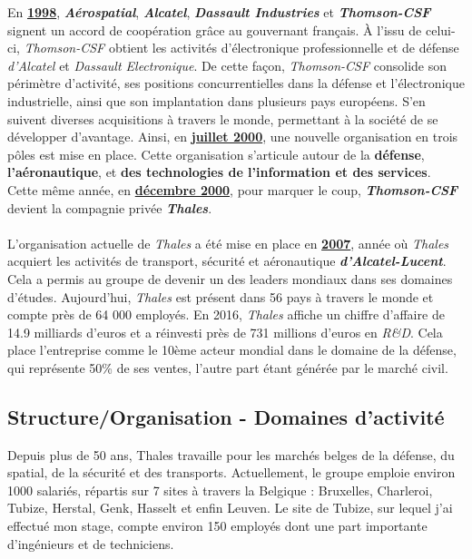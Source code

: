 \documentclass[10pt, oneside, a4paper]{article}
\begin{document}
En \underline{\textbf{1998}}, \textbf{\textit{Aérospatial}}, \textbf{\textit{Alcatel}}, \textbf{\textit{Dassault Industries}} et \textbf{\textit{Thomson-CSF}} signent un accord de coopération grâce au gouvernant français. À l’issu de celui-ci, \textit{Thomson-CSF} obtient les activités d’électronique professionnelle et de défense \textit{d’Alcatel} et \textit{Dassault Electronique}. De cette façon, \textit{Thomson-CSF} consolide son périmètre d'activité, ses positions concurrentielles dans la défense et l'électronique industrielle, ainsi que son implantation dans plusieurs pays européens. S'en suivent diverses acquisitions à travers le monde, permettant à la société de se développer d’avantage. Ainsi, en \underline{\textbf{juillet 2000}}, une nouvelle organisation en trois pôles est mise en place. Cette organisation s'articule autour de la \textbf{défense}, \textbf{l'aéronautique}, et \textbf{des technologies de l'information et des services}. Cette même année, en \underline{\textbf{décembre 2000}}, pour marquer le coup, \textbf{\textit{Thomson-CSF}} devient la compagnie privée \textbf{\textit{Thales}}. \\ \\
L’organisation actuelle de \textit{Thales} a été mise en place en \underline{\textbf{2007}}, année où \textit{Thales} acquiert les activités de transport, sécurité et aéronautique \textbf{\textit{d’Alcatel-Lucent}}. Cela a permis au groupe de devenir un des leaders mondiaux dans ses domaines d’études. Aujourd’hui, \textit{Thales} est présent dans 56 pays à travers le monde et compte près de 64 000 employés. En 2016, \textit{Thales} affiche un chiffre d’affaire de 14.9 milliards d’euros et a réinvesti près de 731 millions d’euros en \textit{R\&D}. Cela place l’entreprise comme le 10ème acteur mondial dans le domaine de la défense, qui représente 50\% de ses ventes, l’autre part étant générée par le marché civil. \\


\subsection{Structure/Organisation - Domaines d'activité}

Depuis plus de 50 ans, Thales travaille pour les marchés belges de la défense, du spatial, de la sécurité et des transports. Actuellement, le groupe emploie environ 1000 salariés, répartis sur 7 sites à travers la Belgique : Bruxelles, Charleroi, Tubize, Herstal, Genk, Hasselt et enfin Leuven. Le site de Tubize, sur lequel j'ai effectué mon stage, compte environ 150 employés dont une part importante d’ingénieurs et de techniciens. 
\end{document}
